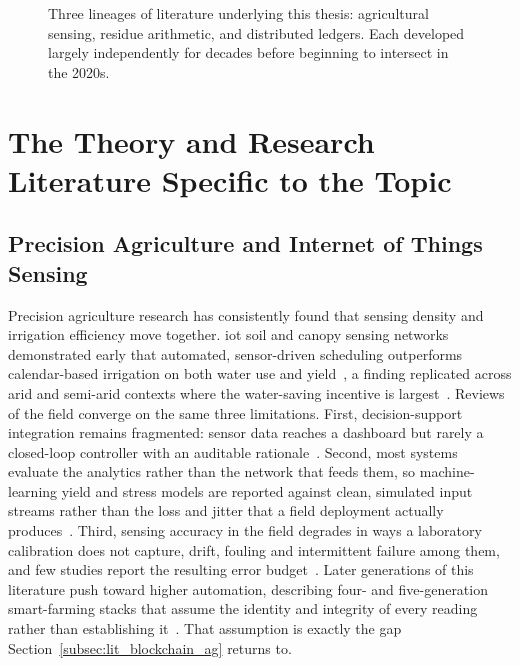 \documentclass[12pt,a4paper,oneside]{book}
\begin{document}
\begin{figure}[htbp]
  \caption{Three lineages of literature underlying this thesis: agricultural
           sensing, residue arithmetic, and distributed ledgers. Each
           developed largely independently for decades before beginning to
           intersect in the 2020s.}
  \label{fig:lit-timeline}
\end{figure}

\section{The Theory and Research Literature Specific to the Topic}
\label{sec:lit_specific}

\subsection{Precision Agriculture and Internet of Things Sensing}
\label{subsec:lit_precision_ag}

Precision agriculture research has consistently found that sensing density
and irrigation efficiency move together. \gls{iot} soil and canopy sensing
networks demonstrated early that automated, sensor-driven scheduling
outperforms calendar-based irrigation on both water use and
yield~\cite{rathi2025smart, brooks2019precisionWater, chatterjee2023precision,
gondchawar2016agriculture4}, a finding replicated across arid and
semi-arid contexts where the water-saving incentive is
largest~\cite{williams2022savings, miller2020climateImpact,
garrido2018mediterranean}. Reviews of the field converge on the same three
limitations. First, decision-support integration remains
fragmented: sensor data reaches a dashboard but rarely a closed-loop
controller with an auditable
rationale~\cite{aydin2021comprehensive, zhang2002precision,
gebbers2010precision, mcbratney2005future}. Second, most systems evaluate
the analytics rather than the network that feeds them, so machine-learning
yield and stress models are reported against clean, simulated input streams
rather than the loss and jitter that a field deployment actually
produces~\cite{chlingaryan2018machine, goap2018iot, mohanty2016using,
van2020review}. Third, sensing accuracy in the field degrades in ways a
laboratory calibration does not capture, drift, fouling and intermittent
failure among them, and few studies report the resulting error
budget~\cite{akhtar2019sensingAccuracy, agri2024sensorAccuracy,
garcia2021sensorFailures, lopez2023remoteFailure}. Later generations of this
literature push toward higher automation, describing four- and
five-generation smart-farming stacks that assume the identity and integrity
of every reading rather than establishing
it~\cite{suleiman2025agriculture5, owusu2025iotAgri, yang2021iotSensing,
singh2019iotSmartIrrigation, jin2025productivity}. That assumption is exactly
the gap Section~\ref{subsec:lit_blockchain_ag} returns to.
\end{document}

